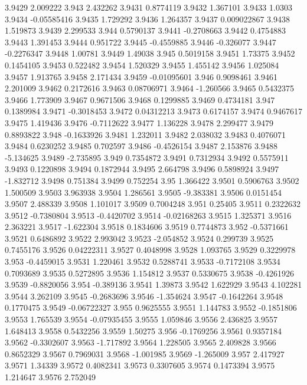 3.9429  2.009222
3.943  2.432262
3.9431  0.8774119
3.9432  1.367101
3.9433  1.0303
3.9434  -0.05585416
3.9435  1.729292
3.9436  1.264357
3.9437  0.009022867
3.9438  1.519873
3.9439  2.299533
3.944  0.5790137
3.9441  -0.2708663
3.9442  0.4754883
3.9443  1.391453
3.9444  0.951722
3.9445  -0.4559885
3.9446  -0.326077
3.9447  -0.2276347
3.9448  1.00781
3.9449  1.49038
3.945  0.5019158
3.9451  1.73375
3.9452  0.1454105
3.9453  0.522482
3.9454  1.520329
3.9455  1.455142
3.9456  1.025084
3.9457  1.913765
3.9458  2.171434
3.9459  -0.01095601
3.946  0.9098461
3.9461  2.201009
3.9462  0.2172616
3.9463  0.08706971
3.9464  -1.260566
3.9465  0.5432375
3.9466  1.773909
3.9467  0.9671506
3.9468  0.1299885
3.9469  0.4734181
3.947  0.1389984
3.9471  -0.3018453
3.9472  0.04312213
3.9473  0.6174157
3.9474  0.9467617
3.9475  1.419436
3.9476  -0.7112622
3.9477  1.136228
3.9478  2.299477
3.9479  0.8893822
3.948  -0.1633926
3.9481  1.232011
3.9482  2.038032
3.9483  0.4076071
3.9484  0.6230252
3.9485  0.702597
3.9486  -0.4526154
3.9487  2.153876
3.9488  -5.134625
3.9489  -2.735895
3.949  0.7354872
3.9491  0.7312934
3.9492  0.5575911
3.9493  0.1220898
3.9494  0.1872944
3.9495  2.664798
3.9496  0.5898924
3.9497  -1.832712
3.9498  0.751384
3.9499  0.752254
3.95  1.366422
3.9501  0.5906763
3.9502  1.500509
3.9503  3.963938
3.9504  1.286561
3.9505  -9.383381
3.9506  0.0151454
3.9507  2.488339
3.9508  1.101017
3.9509  0.7004248
3.951  0.25405
3.9511  0.2322632
3.9512  -0.7380804
3.9513  -0.4420702
3.9514  -0.02168263
3.9515  1.325371
3.9516  2.363221
3.9517  -1.622304
3.9518  0.1834606
3.9519  0.7744873
3.952  -0.5371661
3.9521  0.6486892
3.9522  2.993042
3.9523  -2.054852
3.9524  0.299739
3.9525  0.7455176
3.9526  0.04222311
3.9527  0.4048998
3.9528  1.093765
3.9529  0.3229978
3.953  -0.4459015
3.9531  1.220461
3.9532  0.5288741
3.9533  -0.7172108
3.9534  0.7093689
3.9535  0.5272895
3.9536  1.154812
3.9537  0.5330675
3.9538  -0.4261926
3.9539  -0.8820056
3.954  -0.389136
3.9541  1.39873
3.9542  1.622929
3.9543  4.102281
3.9544  3.262109
3.9545  -0.2683696
3.9546  -1.354624
3.9547  -0.1642264
3.9548  0.1770475
3.9549  -0.06722327
3.955  0.9625555
3.9551  1.144783
3.9552  -0.1851806
3.9553  1.765539
3.9554  -0.07935455
3.9555  1.059846
3.9556  2.436825
3.9557  1.648413
3.9558  0.5432256
3.9559  1.50275
3.956  -0.1769256
3.9561  0.9357184
3.9562  -0.3302607
3.9563  -1.717892
3.9564  1.228505
3.9565  2.409828
3.9566  0.8652329
3.9567  0.7969031
3.9568  -1.001985
3.9569  -1.265009
3.957  2.417927
3.9571  1.34339
3.9572  0.4082341
3.9573  0.3307605
3.9574  0.1473394
3.9575  1.214647
3.9576  2.752049
